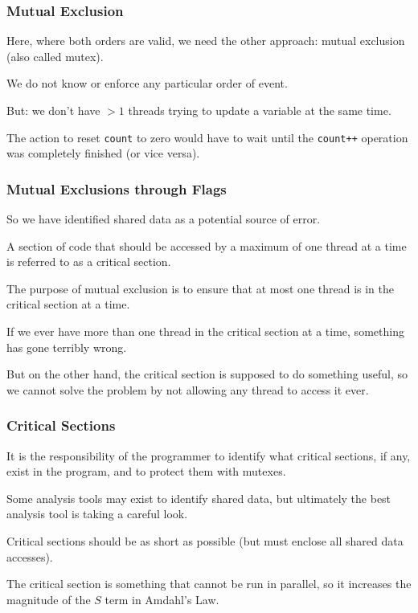 \begin{frame}
\frametitle{Mutual Exclusion}

Here, where both orders are valid, we need the other approach: mutual exclusion (also called \alert{mutex}).

We do not know or enforce any particular order of event.

But: we don't have $>1$ threads trying to update a variable at the same time. 

The action to reset \texttt{count} to zero would have to wait until the \texttt{count++} operation was completely finished (or vice versa). 


\end{frame}

\begin{frame}
\frametitle{Mutual Exclusions through Flags}

So we have identified shared data as a potential source of error. 

A section of code that should be accessed by a maximum of one thread at a time is referred to as a \alert{critical section}. 

The purpose of mutual exclusion is to ensure that at most one thread is in the critical section at a time. 

If we ever have more than one thread in the critical section at a time, something has gone terribly wrong. 

But on the other hand, the critical section is supposed to do something useful, so we cannot solve the problem by not allowing any thread to access it ever.

\end{frame}

\begin{frame}
\frametitle{Critical Sections}

It is the responsibility of the programmer to identify what critical sections, if any, exist in the program, and to protect them with mutexes. 

Some analysis tools may exist to identify shared data, but ultimately the best analysis tool is taking a careful look. 

Critical sections should be as short as possible (but must enclose all shared data accesses). 

The critical section is something that cannot be run in parallel, so it increases the magnitude of the $S$ term in Amdahl's Law.

\end{frame}

